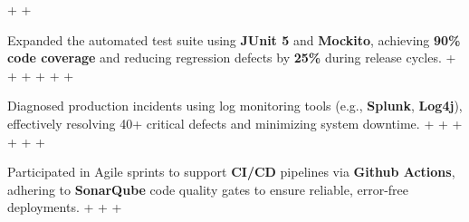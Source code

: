 \documentclass[letterpaper,10pt]{article}                                                                                                                                                                                                                                                                                                                                                                                                                                                                                                                                                                         +
\newcommand{\resumeItem}[1]{                                                                                                                                                                                                                                                                                                                                                                                                                                                                                                                                                                                      +
                                                                                                                                                                                                                                                                                                                                                                                                                                                                                                                                                                                                                   +
   \item\small{#1}\vspace{-3pt}                                                                                                                                                                                                                                                                                                                                                                                                                                                                                                                                                                                    +
                                                                                                                                                                                                                                                                                                                                                                                                                                                                                                                                                                                                                   +
 }                                                                                                                                                                                                                                                                                                                                                                                                                                                                                                                                                                                                                 +
\begin{document}
     \resumeItem{Expanded the automated test suite using \textbf{JUnit 5} and \textbf{Mockito}, achieving \textbf{90\% code coverage} and reducing regression defects by \textbf{25\%} during release cycles.}                                                                                                                                                                                                                                                                                                                                                                                                     +
                                                                                                                                                                                                                                                                                                                                                                                                                                                                                                                                                                                                                   +
     \resumeItem{Diagnosed production incidents using log monitoring tools (e.g., \textbf{Splunk}, \textbf{Log4j}), effectively resolving 40+ critical defects and minimizing system downtime.}                                                                                                                                                                                                                                                                                                                                                                                                                    +
                                                                                                                                                                                                                                                                                                                                                                                                                                                                                                                                                                                                                   +
     \resumeItem{Participated in Agile sprints to support \textbf{CI/CD} pipelines via \textbf{Github Actions}, adhering to \textbf{SonarQube} code quality gates to ensure reliable, error-free deployments.}                                                                                                                                                                                                                                                                                                                                                                                                     +
\end{document}
